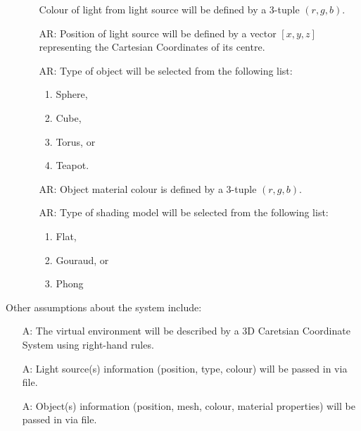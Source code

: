 \documentclass[12pt]{article}
\newcounter{assumpnum} %
\newcounter{assumpnumR} %
\begin{document}
\begin{itemize}
\begin{itemize}
		Colour of light from light source will be defined by a 3-tuple 
		$(r,g,b)$.
		\item[AR\refstepcounter{assumpnumR}\theassumpnumR\label{object_position}:]
		Position of light source will be defined by a vector $[x, y, z]$ 
		representing the Cartesian Coordinates of its centre.
		\item[AR\refstepcounter{assumpnumR}\theassumpnumR\label{object_type}:]
		Type of object will be selected from the following list:
		\begin{enumerate}
			\item Sphere,
			\item Cube,
			\item Torus, or
			\item Teapot.
		\end{enumerate}
		\item[AR\refstepcounter{assumpnumR}\theassumpnumR\label{object_colour}:]
		Object material colour is defined by a 3-tuple $(r,g,b)$.				
		\item[AR\refstepcounter{assumpnumR}\theassumpnumR\label{shader_type}:]
		Type of shading model will be selected from the following list:
		\begin{enumerate}
			\item Flat,
			\item Gouraud, or
			\item Phong
		\end{enumerate}		
	\end{itemize}	
\end{itemize}

Other assumptions about the system include:
\begin{itemize}
\item[A\refstepcounter{assumpnum}\theassumpnum \label{coordinate_system}:] The 
virtual environment will be described by a 3D Caretsian Coordinate System using 
right-hand rules.
\item[A\refstepcounter{assumpnum}\theassumpnum \label{light_source_input}:] 
Light source(s) information (position, type, colour) will be passed in via file.
\item[A\refstepcounter{assumpnum}\theassumpnum \label{object_input}:] 
Object(s) information (position, mesh, colour, material properties) will be 
passed in via file.

\end{itemize}
\end{document}
